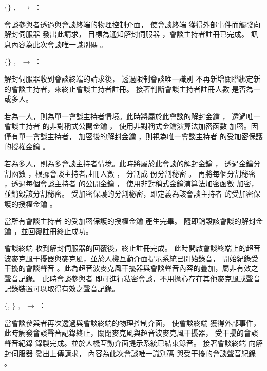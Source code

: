 \begin{pmsgs}
    \item $\{$\DEFsessionID$\}$ $,~$ \DEFmeetingbox $\rightarrow$ \DEFserver：

        會談參與者透過與會談終端的物理控制介面，
    使會談終端 \DEFmeetingbox 獲得外部事件而觸發向解封伺服器 \DEFserver 發出此請求，
    目標為通知解封伺服器 \DEFserver，會談主持者註冊已完成。
    訊息內容為此次會談唯一識別碼 \DEFsessionID。

    \item $\{\}$ $,~$ \DEFserver $\rightarrow$ \DEFmeetingbox：

        解封伺服器收到會談終端的請求後，
    透過限制會談唯一識別 \DEFsessionID 不再新增關聯綁定新的會談主持者，來終止會談主持者註冊。
    接著判斷會談主持者註冊人數 \DEFowreg 是否為一或多人。

        若為一人，則為單一會談主持者情境。此時將屬於此會談的解封金鑰 \DEFunsealKey，
    透過唯一會談主持者 \DEFowner 的非對稱式公開金鑰 \DEFpublicKey，
    使用非對稱式金鑰演算法加密函數 \DEFfuncEncPK{} 加密。因僅有單一會談主持者，
    加密後的解封金鑰 \DEFunsealKey，則視為唯一會談主持者 \DEFowner 的受加密保護的授權金鑰 \DEFakEnc。

        若為多人，則為多會談主持者情境。此時將屬於此會談的解封金鑰 \DEFunsealKey，
    透過金鑰分割函數 \DEFfuncSSS{}，根據會談主持者註冊人數 \DEFowreg，
    分割成 \DEFowreg 份分割秘密 \DEFsharesAll。
    再將每個分割秘密 \DEFshares，透過每個會談主持者 \DEFowner 的公開金鑰 \DEFpublicKey，
    使用非對稱式金鑰演算法加密函數 \DEFfuncEncPK{} 加密，並銷毀該分割秘密。
    受加密保護的分割秘密，即定義為該會談主持者 \DEFowner 的受加密保護的授權金鑰 \DEFakEnc。

        當所有會談主持者 \DEFowner 的受加密保護的授權金鑰 \DEFakEnc 產生完畢。
    隨即銷毀該會談的解封金鑰 \DEFunsealKey，並回覆註冊終止成功。

        會談終端 \DEFmeetingbox 收到解封伺服器的回覆後，終止註冊完成。
    此時開啟會談終端上的超音波麥克風干擾器與麥克風，並於人機互動介面提示系統已開始錄音，
    開始紀錄受干擾的會談聲音 \DEFrecJ。此為超音波麥克風干擾器與會談聲音內容的疊加，屬非有效之聲音記錄。
    此時會談參與者 \DEFattenderAll 即可進行私密會談，不用擔心存在其他麥克風或聲音記錄裝置可以取得有效之聲音記錄。

    \item $\{$\DEFsessionID, \DEFrecJ$\}$ $,~$ \DEFmeetingbox $\rightarrow$ \DEFserver：

        當會談參與者再次透過與會談終端的物理控制介面，
    使會談終端 \DEFmeetingbox 獲得外部事件，此時觸發會談聲音記錄終止，關閉麥克風與超音波麥克風干擾器，
    受干擾的會談聲音紀錄 \DEFrecJ 錄製完成。並於人機互動介面提示系統已結束錄音。
    接著會談終端 \DEFmeetingbox 向解封伺服器 \DEFserver 發出上傳請求，
    內容為此次會談唯一識別碼 \DEFsessionID 與受干擾的會談聲音紀錄 \DEFrecJ。


\end{pmsgs}
